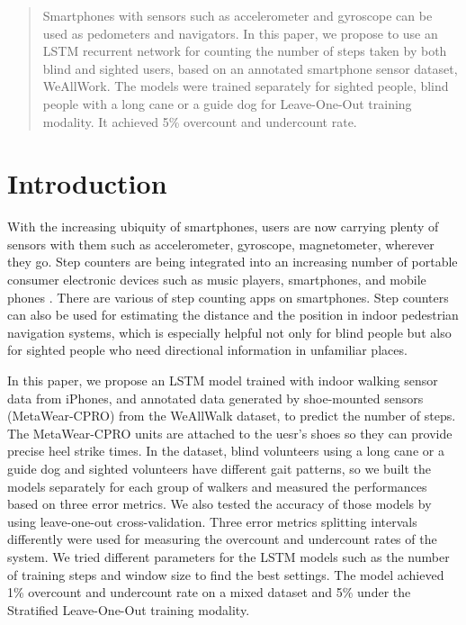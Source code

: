 \documentclass[11pt]{article}
\begin{document}
{\begin{abstract}
Smartphones with sensors such as accelerometer and gyroscope can be used as pedometers and navigators. In this paper, we propose to use an LSTM recurrent network for counting the number of steps taken by both blind and sighted users, based on an annotated smartphone sensor dataset, WeAllWork. The models were trained separately for sighted people, blind people with a long cane or a guide dog for Leave-One-Out training modality. It achieved 5\% overcount and undercount rate.

\end{abstract}

\section{Introduction}

With the increasing ubiquity of smartphones, users are now carrying plenty of sensors with them such as accelerometer, gyroscope, magnetometer, wherever they go. Step counters are being integrated into an increasing number of portable consumer electronic devices such as music players, smartphones, and mobile phones \cite{wiki:pedometer}. There are various of step counting apps on smartphones. Step counters can also be used for estimating the distance and the position in indoor pedestrian navigation systems, which is especially helpful not only for blind people but also for sighted people who need directional information in unfamiliar places.

In this paper, we propose an LSTM model trained with indoor walking sensor data from iPhones, and annotated data generated by shoe-mounted sensors (MetaWear-CPRO) from the WeAllWalk dataset, to predict the number of steps. The MetaWear-CPRO units are attached to the uesr's shoes so they can provide precise heel strike times. In the dataset, blind volunteers using a long cane or a guide dog and sighted volunteers have different gait patterns, so we built the models separately for each group of walkers and measured the performances based on three error metrics. We also tested the accuracy of those models by using leave-one-out cross-validation. Three error metrics splitting intervals differently were used for measuring the overcount and undercount rates of the system. We tried different parameters for the LSTM models such as the number of training steps and window size to find the best settings. The model achieved 1\% overcount and undercount rate on a mixed dataset and 5\% under the Stratified Leave-One-Out training modality.



}
\end{document}

